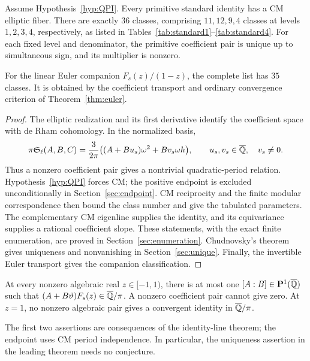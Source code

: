 \begin{theorem}\label{thm:main-conditional}
Assume Hypothesis~\ref{hyp:QPI}. Every primitive standard identity has
a CM elliptic fiber. There are exactly $36$ classes, comprising
$11,12,9,4$ classes at levels $1,2,3,4$, respectively, as listed in
Tables~\ref{tab:standard1}--\ref{tab:standard4}.
For each fixed level and denominator, the primitive coefficient pair
is unique up to simultaneous sign, and its multiplier is nonzero.

For the linear Euler companion $F_s(z)/(1-z)$, the complete list has
$35$ classes. It is obtained by the coefficient transport and ordinary
convergence criterion of Theorem~\ref{thm:euler}.
\end{theorem}
\begin{proof}
The elliptic realization and its first derivative identify the
coefficient space with de Rham cohomology. In the normalized basis,
\begin{equation}\label{rev:eq:leading-reduction}
 \pi\mathfrak S_\ell(A,B,C)
  =\frac{3}{2\pi}\bigl((A+Bu_s)\omega^2+Bv_s\omega h\bigr),
 \qquad u_s,v_s\in\overline{\mathbb Q},\quad v_s\ne0.
\end{equation}
Thus a nonzero coefficient pair gives a nontrivial quadratic-period
relation. Hypothesis~\ref{hyp:QPI} forces CM; the positive endpoint is
excluded unconditionally in Section~\ref{sec:endpoint}. CM reciprocity
and the finite modular correspondence then bound the class number and
give the tabulated parameters. The complementary CM eigenline supplies
the identity, and its equivariance supplies a rational coefficient
slope. These statements, with the exact finite enumeration, are proved
in Section~\ref{sec:enumeration}. Chudnovsky's theorem gives uniqueness
and nonvanishing in Section~\ref{sec:unique}. Finally, the invertible
Euler transport gives the companion classification.
\end{proof}

\begin{theorem}\label{thm:unconditional}
At every nonzero algebraic real $z\in[-1,1)$, there is at most one
$[A:B]\in\mathbf P^1(\overline{\mathbb Q})$ such that
$(A+B\vartheta)F_s(z)\in\overline{\mathbb Q}/\pi$. A nonzero coefficient pair cannot
give zero. At $z=1$, no nonzero algebraic pair gives a convergent
identity in $\overline{\mathbb Q}/\pi$.
\end{theorem}

The first two assertions are consequences of the identity-line theorem;
the endpoint uses CM period independence. In particular, the uniqueness
assertion in the leading theorem needs no conjecture.

